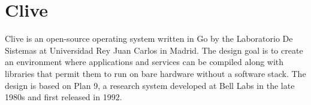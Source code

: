 \section{Clive}
Clive is an open-source operating system written in Go by the
Laboratorio De Sistemas at Universidad Rey Juan Carlos in
Madrid\cite{hid-sp18-419-www-clive-lsub}. The design goal is to create
an environment where applications and services can be compiled along
with libraries that permit them to run on bare hardware without a
software stack\cite{hid-sp18-419-www-clive-lsub2014}. The design is
based on Plan 9, a research system developed at Bell Labs in the late
1980s and first released in 1992\cite{hid-sp18-419-www-about-plan9}.
